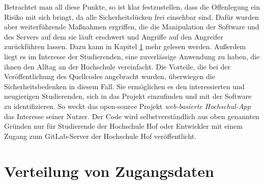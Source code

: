 Betrachtet man all diese Punkte, so ist klar festzustellen, dass die Offenlegung ein Risiko mit sich bringt, da alle Sicherheitslücken frei einsehbar sind. Dafür wurden aber weiterführende Maßnahmen ergriffen, die die Manipulation der Software und des Servers auf dem sie läuft erschwert und Angriffe auf den Angreifer zurückführen lassen. Dazu kann in Kapitel \ref{sec:apikeys} mehr gelesen werden. Außerdem liegt es im Interesse der Studierenden, eine zuverlässige Anwendung zu haben, die ihnen den Alltag an der Hochschule vereinfacht. Die Vorteile, die bei der Veröffentlichung des Quellcodes angebracht wurden, überwiegen die Sicherheitsbedenken in diesem Fall. Sie ermöglichen es den interessierten und neugierigen Studierenden, sich in das Projekt einzufinden und mit der Software zu identifizieren. So weckt das open-source Projekt \textit{web-basierte Hochschul-\ac{App}} das Interesse seiner Nutzer. Der Code wird selbstverständlich aus oben genannten Gründen nur für Studierende der Hochschule Hof oder Entwickler mit einem Zugang zum GitLab-Server der Hochschule Hof veröffentlicht.  

\section{Verteilung von Zugangsdaten}
\label{sec:apikeys}

